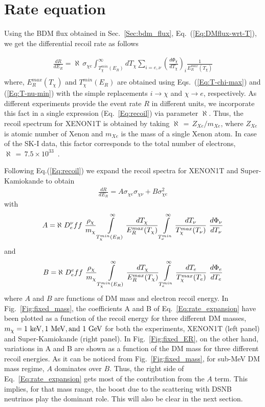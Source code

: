 \documentclass[11pt,prd,twocolumn,nofootinbib,reprint,superscriptaddress,longbibliography,colorlinks=true,citecolor=blue]{revtex4-1}
\def\bea{\begin{eqnarray}}
\def\eea{\end{eqnarray}}
\begin{document}
\section{Rate equation}
\label{Sec:rate}

 Using the BDM flux obtained in Sec.~\ref{Sec:bdm_flux}, Eq.~(\ref{Eq:DMflux-wrt-T}), we get the differential recoil rate as follows
 
\bea
 \frac{dR}{dE_R} = \aleph\,\sigma_{\chi e} \int_{T_{\chi}^{min}(E_R)}^\infty dT_\chi \sum_{i=e,\nu} \left(\frac{d\Phi_\chi}{dT_\chi}\right)_i \frac{1}{E_R^{max}(T_\chi)} \nonumber \\
 \label{Eq:recoil}
 \eea  
where, $E_R^{max}(T_\chi)$ and $T_{\chi}^{min}(E_R)$ are obtained using Eqs.~(\ref{Eq:T-chi-max}) and (\ref{Eq:T-nu-min}) with the simple replacements $ i \to \chi$ and $\chi \to e$, respectively. As different experiments provide the event rate $R$ in different units, we incorporate this fact in a single expression (Eq.~\ref{Eq:recoil}) via parameter $\aleph$. Thus, the recoil spectrum for XENON1T is obtained by taking $\aleph\,=\,{Z_{Xe}}/{m_{Xe}}$, where $Z_{Xe}$ is  atomic number of Xenon and $m_{Xe}$ is the mass of a single Xenon atom. In case of the SK-I data, this factor corresponds to the total number of electrons, $\aleph\,=\,7.5 \times 10^{33}$~\cite{Super-Kamiokande:2011lwo,Ema:2018bih, Cappiello:2019qsw}.

Following Eq.(\ref{Eq:recoil}) we expand the recoil spectra for XENON1T and Super-Kamiokande to obtain
  \bea
 \frac{dR}{dE_R} = A \sigma_{\chi e} \sigma_{\chi \nu} + B \sigma_{\chi e}^2 
 \label{Eq:rate_expansion}
 \eea
 with
 \bea
 A = \aleph~D^\nu_eff~\frac{\rho_\chi}{m_\chi} \int\displaylimits_{T_{\chi}^{min}(E_R)}^\infty  \frac{dT_\chi}{E_R^{max}(T_\chi)} \int\displaylimits^{\infty}_{T_\nu^{min}}  \frac{dT_\nu}{T_\chi^{max}(T_\nu)}~ \frac{d\Phi_\nu}{dT_\nu} \nonumber \\
 \eea 
 and
 \bea
 B = \aleph~D^e_eff~\frac{\rho_\chi}{m_\chi} \int\displaylimits_{T_{\chi}^{min}(E_R)}^\infty  \frac{dT_\chi}{E_R^{max}(T_\chi)} \int\displaylimits^{\infty}_{T_e^{min}}  \frac{dT_e}{T_\chi^{max}(T_e)}~ \frac{d\Phi_e}{dT_e} \nonumber \\
 \eea 
where $A$ and $B$ are functions of DM mass and electron recoil energy. In Fig.~\ref{Fig:fixed_mass}, the coefficients A and B of Eq.~\ref{Eq:rate_expansion} have been plotted as a function of the recoil energy for three different DM masses, $m_\chi = 1~\rm{keV}, 1~\rm{MeV}, \text{and} \, \, 1~\rm{GeV}$ for both the experiments, XENON1T (left panel) and Super-Kamiokande (right panel). In Fig.~\ref{Fig:fixed_ER}, on the other hand, variations in A and B are shown as a function of the DM mass
for three different recoil energies. As it can be noticed from Fig.~\ref{Fig:fixed_mass}, for sub-MeV DM mass regime, $A$ dominates over $B$. Thus, the right side of Eq.~\ref{Eq:rate_expansion} gets most of the contribution from the $A$ term. This implies, for that mass range, the boost due to the scattering with DSNB neutrinos play the dominant role. This will also be clear in the next section.
\end{document}
